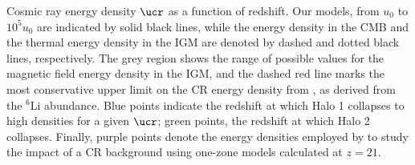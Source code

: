 \label{fig:ucr}
Cosmic ray energy density $\ucr$ as a function of redshift.  Our models, from $u_0$ to $10^5u_0$ are indicated by solid black lines, while the energy density in the CMB and the thermal energy density in the IGM are denoted by dashed and dotted black lines, respectively. The grey region shows the range of possible values for the magnetic field energy density in the IGM, and the dashed red line marks the most conservative upper limit on the CR energy density from \citep{RollindeVangioniOlive2006}, as derived from the $^6$Li abundance. Blue points indicate the redshift at which Halo 1 collapses to high densities for a given $\ucr$; green points, the redshift at which Halo 2 collapses.  Finally, purple points denote the energy densities employed by \citep{StacyBromm2007} to study the impact of a CR background using one-zone models calculated at $z=21$.